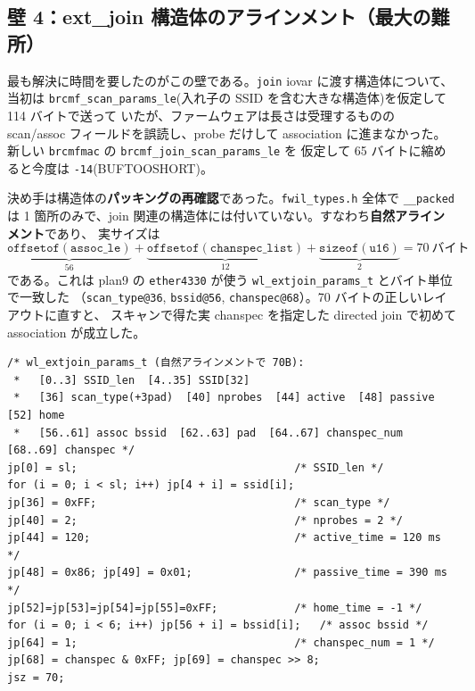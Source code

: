 \documentclass[a4paper,11pt]{ltjsarticle}
\begin{document}
\subsection{壁 4：ext\_join 構造体のアラインメント（最大の難所）}
最も解決に時間を要したのがこの壁である。\texttt{join} iovar に渡す構造体について、当初は
\texttt{brcmf\_scan\_params\_le}(入れ子の SSID を含む大きな構造体)を仮定して 114 バイトで送って
いたが、ファームウェアは長さは受理するものの scan/assoc フィールドを誤読し、probe だけして
association に進まなかった。新しい \texttt{brcmfmac} の \texttt{brcmf\_join\_scan\_params\_le} を
仮定して 65 バイトに縮めると今度は \texttt{-14}(BUFTOOSHORT)。

決め手は構造体の\textbf{パッキングの再確認}であった。\texttt{fwil\_types.h} 全体で \texttt{\_\_packed}
は 1 箇所のみで、join 関連の構造体には付いていない。すなわち\textbf{自然アラインメント}であり、
実サイズは
\[
  \underbrace{\mathtt{offsetof(assoc\_le)}}_{56}
  + \underbrace{\mathtt{offsetof(chanspec\_list)}}_{12}
  + \underbrace{\mathtt{sizeof(u16)}}_{2}
  = 70\ \text{バイト}
\]
である。これは plan9 の \texttt{ether4330} が使う \texttt{wl\_extjoin\_params\_t} とバイト単位で一致した
（\texttt{scan\_type@36}, \texttt{bssid@56}, \texttt{chanspec@68}）。70 バイトの正しいレイアウトに直すと、
スキャンで得た実 chanspec を指定した directed join で初めて association が成立した。

\begin{lstlisting}[caption={壁 4 を解いた 70 バイト join 構造体（抜粋）}]
/* wl_extjoin_params_t (自然アラインメントで 70B):
 *   [0..3] SSID_len  [4..35] SSID[32]
 *   [36] scan_type(+3pad)  [40] nprobes  [44] active  [48] passive  [52] home
 *   [56..61] assoc bssid  [62..63] pad  [64..67] chanspec_num  [68..69] chanspec */
jp[0] = sl;                                  /* SSID_len */
for (i = 0; i < sl; i++) jp[4 + i] = ssid[i];
jp[36] = 0xFF;                               /* scan_type */
jp[40] = 2;                                  /* nprobes = 2 */
jp[44] = 120;                                /* active_time = 120 ms */
jp[48] = 0x86; jp[49] = 0x01;                /* passive_time = 390 ms */
jp[52]=jp[53]=jp[54]=jp[55]=0xFF;            /* home_time = -1 */
for (i = 0; i < 6; i++) jp[56 + i] = bssid[i];   /* assoc bssid */
jp[64] = 1;                                  /* chanspec_num = 1 */
jp[68] = chanspec & 0xFF; jp[69] = chanspec >> 8;
jsz = 70;
\end{lstlisting}
\end{document}
